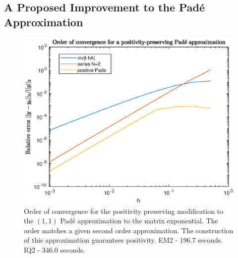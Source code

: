 
\subsection{A Proposed Improvement to the Pad\'e Approximation}

\begin{figure}
    \centering
    \includegraphics[width=0.75\linewidth]{Matlab/positivepadeconvergence.eps}
    \caption{
        Order of convergence for the positivity preserving modification to the $(1,1)$ Pad\'e approximation to the matrix exponential.
        The order matches a given second order approximation.
        The construction of this approximation guarantees positivity.
        EM2 - 196.7 seconds.
        IQ2 - 346.0 seconds.
    }
    \label{fig:padepositive}
\end{figure}

